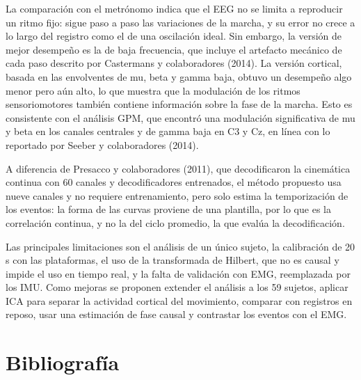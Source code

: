 \documentclass[10pt]{article}
\begin{document}
La comparación con el metrónomo indica que el EEG no se limita a reproducir un ritmo fijo: sigue paso a paso las variaciones de la marcha, y su error no crece a lo largo del registro como el de una oscilación ideal. Sin embargo, la versión de mejor desempeño es la de baja frecuencia, que incluye el artefacto mecánico de cada paso descrito por Castermans y colaboradores (2014). La versión cortical, basada en las envolventes de mu, beta y gamma baja, obtuvo un desempeño algo menor pero aún alto, lo que muestra que la modulación de los ritmos sensoriomotores también contiene información sobre la fase de la marcha. Esto es consistente con el análisis GPM, que encontró una modulación significativa de mu y beta en los canales centrales y de gamma baja en C3 y Cz, en línea con lo reportado por Seeber y colaboradores (2014).

A diferencia de Presacco y colaboradores (2011), que decodificaron la cinemática continua con 60 canales y decodificadores entrenados, el método propuesto usa nueve canales y no requiere entrenamiento, pero solo estima la temporización de los eventos: la forma de las curvas proviene de una plantilla, por lo que es la correlación continua, y no la del ciclo promedio, la que evalúa la decodificación.

Las principales limitaciones son el análisis de un único sujeto, la calibración de 20 s con las plataformas, el uso de la transformada de Hilbert, que no es causal y impide el uso en tiempo real, y la falta de validación con EMG, reemplazada por los IMU. Como mejoras se proponen extender el análisis a los 59 sujetos, aplicar ICA para separar la actividad cortical del movimiento, comparar con registros en reposo, usar una estimación de fase causal y contrastar los eventos con el EMG.


\section{Bibliografía}
\end{document}
